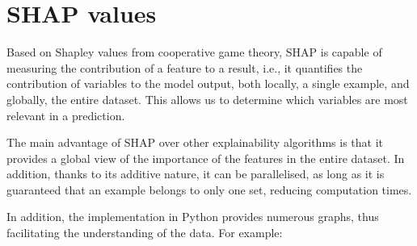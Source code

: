 \section{SHAP values}

Based on Shapley values from cooperative game theory, SHAP is capable of measuring the contribution of a feature to a result, i.e., it quantifies the contribution of variables to the model output, both locally, a single example, and globally, the entire dataset. This allows us to determine which variables are most relevant in a prediction. 

The main advantage of SHAP over other explainability algorithms is that it provides a global view of the importance of the features in the entire dataset. In addition, thanks to its additive nature, it can be parallelised, as long as it is guaranteed that an example belongs to only one set, reducing computation times.

In addition, the implementation in Python \cite{shap} provides numerous graphs, thus facilitating the understanding of the data. For example:

